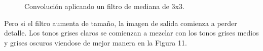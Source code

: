 \documentclass[conference]{IEEEtran}
\begin{document}
\begin{figure}[h]
	\centering
	\caption{Convoluci\'on aplicando un filtro de mediana de 3x3.}	
\end{figure}
\newpage
Pero si el filtro aumenta de tama\~no, la imagen de salida comienza a perder detalle. Los tonos grises claros se comienzan a mezclar con los tonos grises medios y grises oscuros viendose de mejor manera en la Figura 11.
\end{document}
